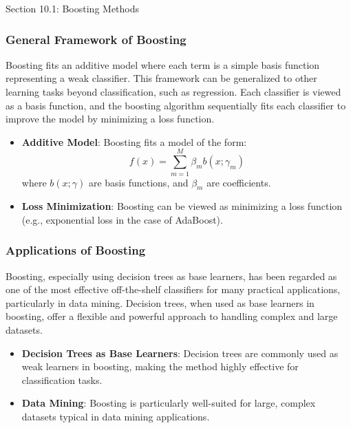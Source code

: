 \begin{notes}{Section 10.1: Boosting Methods}
    \subsubsection*{General Framework of Boosting}
    
    Boosting fits an additive model where each term is a simple basis function representing a weak classifier. This framework can be generalized to other learning tasks beyond classification, such 
    as regression. Each classifier is viewed as a basis function, and the boosting algorithm sequentially fits each classifier to improve the model by minimizing a loss function.
    
    \begin{highlight}
        \begin{itemize}
            \item \textbf{Additive Model}: Boosting fits a model of the form:
            \[
            f(x) = \sum_{m=1}^{M} \beta_m b(x; \gamma_m)
            \]
            where \(b(x; \gamma)\) are basis functions, and \(\beta_m\) are coefficients.
            \item \textbf{Loss Minimization}: Boosting can be viewed as minimizing a loss function (e.g., exponential loss in the case of AdaBoost).
        \end{itemize}
    \end{highlight}
    
    \subsubsection*{Applications of Boosting}
    
    Boosting, especially using decision trees as base learners, has been regarded as one of the most effective off-the-shelf classifiers for many practical applications, particularly in data mining. 
    Decision trees, when used as base learners in boosting, offer a flexible and powerful approach to handling complex and large datasets.
    
    \begin{highlight}
        \begin{itemize}
            \item \textbf{Decision Trees as Base Learners}: Decision trees are commonly used as weak learners in boosting, making the method highly effective for classification tasks.
            \item \textbf{Data Mining}: Boosting is particularly well-suited for large, complex datasets typical in data mining applications.
        \end{itemize}
    \end{highlight}
    

\end{notes}
